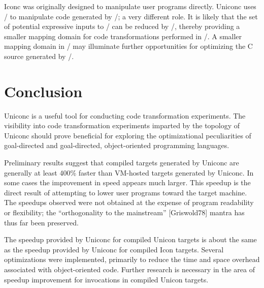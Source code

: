 Iconc was originally designed to manipulate user programs
directly. Uniconc uses \Ic/ to manipulate code generated by \Ut/; a
very different role. It is likely that the set of potential expressive
inputs to \Ic/ can be reduced by \Ut/, thereby providing a smaller
mapping domain for code transformations performed in \Ic/. A smaller
mapping domain in \Ic/ may illuminate further opportunities for
optimizing the C source generated by \Ic/.




\section{Conclusion}

Uniconc is a useful tool for conducting code transformation
experiments. The visibility into code transformation experiments
imparted by the topology of Uniconc should prove beneficial for
exploring the optimizational peculiarities of goal-directed and
goal-directed, object-oriented programming languages.

Preliminary results suggest that compiled targets generated by Uniconc
are generally at least 400\% faster than VM-hosted targets generated
by Uniconc.  In some cases the improvement in speed appears much
larger. This speedup is the direct result of attempting to lower user
programs toward the target machine.  The speedups observed were not
obtained at the expense of program readability or flexibility; the
``orthogonality to the mainstream'' [Griswold78] mantra has thus far
been preserved.

The speedup provided by Uniconc for compiled Unicon targets is about
the same as the speedup provided by Uniconc for compiled Icon
targets. Several optimizations were implemented, primarily to reduce
the time and space overhead associated with object-oriented
code. Further research is necessary in the area of speedup improvement
for invocations in compiled Unicon targets.
